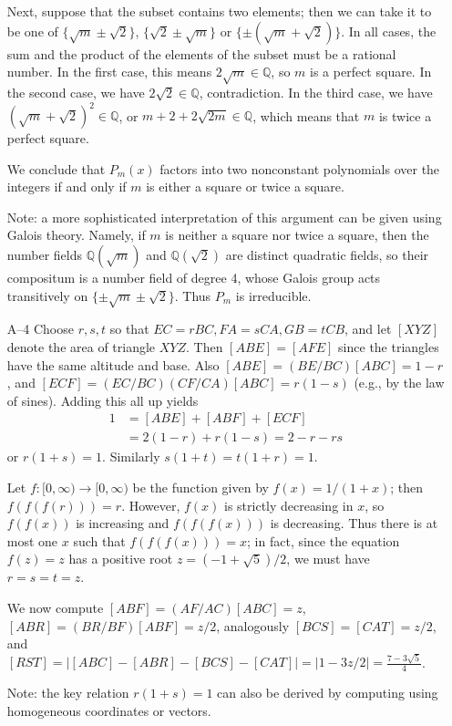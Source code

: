 \documentclass[amssymb,twocolumn,pra,10pt,aps]{revtex4-1}
\newcommand{\QQ}{\mathbb{Q}}
\begin{document}
\begin{itemize}
Next, suppose that the subset contains two elements; then we can take
it to be one of $\{\sqrt{m} \pm \sqrt{2}\}$, $\{\sqrt{2} \pm \sqrt{m}\}$
or $\{\pm (\sqrt{m} + \sqrt{2})\}$. In all cases, the sum and the product
of the elements of the
subset must be a rational number. In the first case, this means
$2\sqrt{m} \in \QQ$, so $m$ is a perfect square. In the second case,
we have $2 \sqrt{2} \in \QQ$, contradiction. In the third case, we have
$(\sqrt{m} + \sqrt{2})^2 \in \QQ$, or $m + 2 + 2\sqrt{2m} \in \QQ$, which
means that $m$ is twice a perfect square.

We conclude that $P_m(x)$ factors into two nonconstant polynomials over
the integers if and only if $m$ is either a square or twice a square.

Note: a more sophisticated interpretation of this argument can be given
using Galois theory. Namely, if $m$ is neither a square nor twice a square,
then the number fields $\QQ(\sqrt{m})$ and $\QQ(\sqrt{2})$ are distinct
quadratic fields, so their compositum is a number field of degree 4, whose
Galois group acts transitively on $\{\pm \sqrt{m} \pm \sqrt{2}\}$. Thus
$P_m$ is irreducible.

\item[A--4]
Choose $r,s,t$ so that $EC = rBC, FA = sCA, GB = tCB$, and let
$[XYZ]$ denote the area of triangle $XYZ$. Then $[ABE] = [AFE]$ since
the triangles have the same altitude and base.
Also $[ABE] = (BE/BC) [ABC] = 1-r$, and
$[ECF] = (EC/BC)(CF/CA)[ABC] = r(1-s)$ (e.g., by the law of sines).
Adding this
all up yields
\begin{align*}
1 &= [ABE] + [ABF] + [ECF] \\
&= 2(1-r) + r(1-s) = 2-r-rs
\end{align*}
or $r(1+s) = 1$.
Similarly $s(1+t) = t(1+r) = 1$.

Let $f: [0, \infty) \to [0, \infty)$ be the function given by
$f(x) = 1/(1+x)$; then $f(f(f(r))) = r$.
However, $f(x)$ is strictly decreasing in $x$, so $f(f(x))$ is increasing
and $f(f(f(x)))$ is decreasing. Thus there is at most one $x$ such that
$f(f(f(x))) = x$;
in fact, since the equation $f(z) = z$ has a positive root
$z = (-1 + \sqrt{5})/2$, we must have $r=s=t=z$.

We now compute $[ABF] = (AF/AC) [ABC] = z$,
$[ABR] = (BR/BF) [ABF] = z/2$, analogously $[BCS] = [CAT] = z/2$, and
$[RST] = |[ABC] - [ABR] - [BCS] - [CAT]| = |1 - 3z/2| = \frac{7 - 3
\sqrt{5}}{4}$.

Note: the key relation $r(1+s) = 1$ can also be derived by computing
using homogeneous coordinates or vectors.


\end{itemize}
\end{document}
